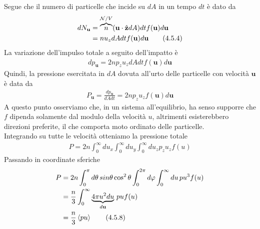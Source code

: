 \documentclass{article}
\begin{document}
Segue che il numero di particelle che incide su $dA$ in un tempo $dt$ è dato da 
\begin{align}
    dN_{\mathbf{u}} &= \overbrace{n}^{\mathcal{N}/V}(\mathbf{u} \cdot \hat{\mathbf{z}}dA)dtf(\mathbf{u})d\mathbf{u} \notag \\
    &= nu_zdAdtf(\mathbf{u})d\mathbf{u} \tag{4.5.4}
\end{align}
La variazione dell'impulso totale a seguito dell'impatto è
\begin{align}
    dp_{\mathbf{u}} = 2np_zu_zdAdtf(\mathbf{u})d\mathbf{u} \tag{4.5.5}
\end{align}
Quindi, la pressione esercitata in $dA$ dovuta all'urto delle particelle con velocità $\mathbf{u}$ è data da
\begin{align}
    P_\mathbf{u} = \frac{dp_\mathbf{u}}{dAdt} = 2np_zu_zf(\mathbf{u})d\mathbf{u} \tag{4.5.6}
\end{align}
A questo punto osserviamo che, in un sistema all'equilibrio, ha senso supporre che $f$ dipenda solamente dal modulo della velocità $u$, altrimenti esisterebbero direzioni preferite, il che comporta moto ordinato delle particelle. \\
Integrando su tutte le velocità otteniamo la pressione totale
\begin{align}
    P = 2n\int_0^\infty du_x\int_0^\infty du_y\int_0^\infty du_z p_zu_zf(u) \tag{4.5.7}
\end{align}
Passando in coordinate sferiche
\begin{align}
    P &= 2n\int_0^\pi d\theta \, sin\theta \cos^2\theta\int_0^{2\pi}d\varphi \int_0^\infty du \, pu^3f(u) \notag \\
    &= \frac{n}{3}\int_0^\infty \underbrace{4\pi u^2du}_{d\mathbf{u}} \, puf(u) \notag \\
    &= \frac{n}{3}\braket{pu} \tag{4.5.8}
\end{align}

\newpage
\end{document}
